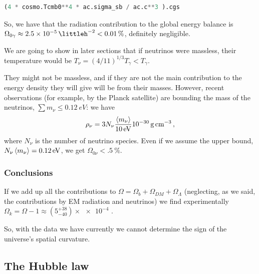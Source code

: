 \documentclass[main.tex]{subfiles}
\begin{document}
\begin{lstlisting}[language=Python]
(4 * cosmo.Tcmb0**4 * ac.sigma_sb / ac.c**3 ).cgs
\end{lstlisting}

So, we have that the radiation contribution to the global energy balance is \(\Omega_{0 \gamma } \approx \SI{2.5e-5}{\littleh^{-2}} < \SI{.01}{\percent}\), definitely negligible.


We are going to show in later sections that if neutrinos were massless, their temperature would be \(T_\nu = (4/11)^{1/3} T_\gamma < T_\gamma \).

They might not be massless, and if they are not the main contribution to the energy density they will give will be from their masses.
However, recent observations (for example, by the Planck satellite) are bounding the mass of the neutrinos,
\(\sum m_\nu \leq \SI{0.12}{eV} \): we have 
%
\begin{equation}
\rho_\nu = 3 N_\nu \frac{\expval{m_\nu} }{\SI{10}{eV}} \SI{e-30}{\gram\per\cubic\centi\metre}
\,,
\end{equation}
%
where \(N_{\nu }\) is the number of neutrino species. 
Even if we assume the upper bound, \(N_{\nu } \expval{m_{\nu }} = \SI{.12}{eV}\), we get \(\Omega_{0 \nu } < \SI{.5}{\percent}\). 

\subsubsection{Conclusions}

If we add up all the contributions to  \(\Omega = \Omega_b + \Omega_{DM} + \Omega_{\Lambda }\) (neglecting, as we said, the contributions by EM radiation and neutrinos) we find experimentally \(\Omega_{k} = \Omega-1 \approx (5^{+38}_{-40}) \times  \num{e-4}\) \cite[Table A.2]{planckcollaborationPlanck2018Results2019a}.

So, with the data we have currently we cannot determine the sign of the universe's spatial curvature.

\subsection{The Hubble law}
\end{document}
